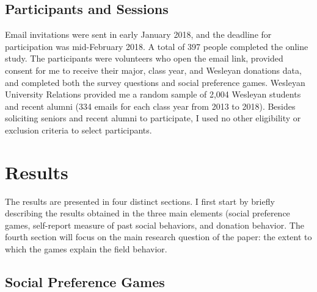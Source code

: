 \documentclass{article}
\begin{document}
\subsection{Participants and Sessions}
Email invitations were sent in early January 2018, and the deadline for participation was mid-February 2018. A total of 397 people completed the online study. The participants were volunteers who open the email link, provided consent for me to receive their major, class year, and Wesleyan donations data, and completed both the survey questions and social preference games. Wesleyan University Relations provided me a random sample of 2,004 Wesleyan students and recent alumni (334 emails for each class year from 2013 to 2018). Besides soliciting seniors and recent alumni to participate, I used no other eligibility or exclusion criteria to select participants.


\section{Results}
The results are presented in four distinct sections. I first start by briefly describing the results obtained in the three main elements (social preference games, self-report measure of past social behaviors, and donation behavior. The fourth section will focus on the main research question of the paper: the extent to which the games explain the field behavior.

\subsection{Social Preference Games}
\end{document}
